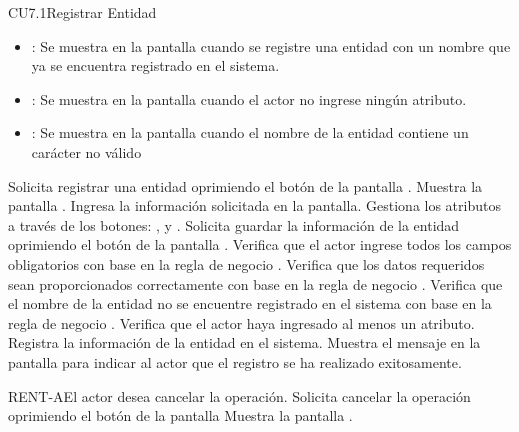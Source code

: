 \begin{UseCase}{CU7.1}{Registrar Entidad}
{\begin{itemize}
		\item {}: Se muestra en la pantalla  cuando se registre una entidad con un nombre que ya se encuentra registrado en el sistema.
		\item {}: Se muestra en la pantalla  cuando el actor no ingrese ningún atributo.
		\item {}: Se muestra en la pantalla  cuando el nombre de la entidad contiene un carácter no válido
		\end{itemize}
		}
	\end{UseCase}
	\begin{UCtrayectoria}
		\UCpaso[\UCactor] Solicita registrar una entidad oprimiendo el botón  de la pantalla .
		\UCpaso[\UCsist] Muestra la pantalla .
		\UCpaso[\UCactor] Ingresa la información solicitada en la pantalla. \label{CU7.1-P3}
		\UCpaso[\UCactor] Gestiona los atributos a través de los botones: , \editar y \eliminar. \label{CU7.1-P4}
		\UCpaso[\UCactor] Solicita guardar la información de la entidad oprimiendo el botón  de la pantalla . 
		\UCpaso[\UCsist] Verifica que el actor ingrese todos los campos obligatorios con base en la regla de negocio . 
		\UCpaso[\UCsist] Verifica que los datos requeridos sean proporcionados correctamente con base en la regla de negocio .  
		\UCpaso[\UCsist] Verifica que el nombre de la entidad no se encuentre registrado en el sistema con base en la regla de negocio . 
		\UCpaso[\UCsist] Verifica que el actor haya ingresado al menos un atributo. 
		\UCpaso[\UCsist] Registra la información de la entidad en el sistema.
		\UCpaso[\UCsist] Muestra el mensaje  en la pantalla  para indicar al actor que el registro se ha realizado exitosamente.
	\end{UCtrayectoria}		
	
	\begin{UCtrayectoriaA}{RENT-A}{El actor desea cancelar la operación.}
		\UCpaso[\UCactor] Solicita cancelar la operación oprimiendo el botón  de la pantalla 
		\UCpaso[\UCsist] Muestra la pantalla .
	\end{UCtrayectoriaA}

